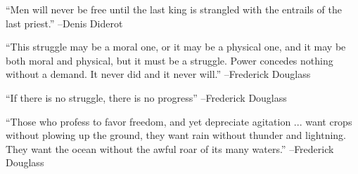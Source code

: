 \documentclass{article}%
\begin{document}
\linebreak%
\vspace{1mm}%
\begin{minipage}{\textwidth}%
\flushleft%
“Men will never be free until the last king is strangled with the entrails of the last priest.”%
\linebreak%
\vspace{1mm}%
–Denis Diderot%
\linebreak%
\vspace{1mm}%
\end{minipage}%
\linebreak%
\vspace{1mm}%
\begin{minipage}{\textwidth}%
\flushleft%
“This struggle may be a moral one, or it may be a physical one, and it may be both moral and physical, but it must be a struggle. Power concedes nothing without a demand. It never did and it never will.”%
\linebreak%
\vspace{1mm}%
–Frederick Douglass%
\linebreak%
\vspace{1mm}%
\end{minipage}%
\linebreak%
\vspace{1mm}%
\begin{minipage}{\textwidth}%
\flushleft%
“If there is no struggle, there is no progress”%
\linebreak%
\vspace{1mm}%
–Frederick Douglass%
\linebreak%
\vspace{1mm}%
\end{minipage}%
\linebreak%
\vspace{1mm}%
\begin{minipage}{\textwidth}%
\flushleft%
“Those who profess to favor freedom, and yet depreciate agitation ... want crops without plowing up the ground, they want rain without thunder and lightning. They want the ocean without the awful roar of its many waters.”%
\linebreak%
\vspace{1mm}%
–Frederick Douglass%
\linebreak%
\vspace{1mm}%
\end{minipage}%
\linebreak%
\vspace{1mm}%
\end{document}

